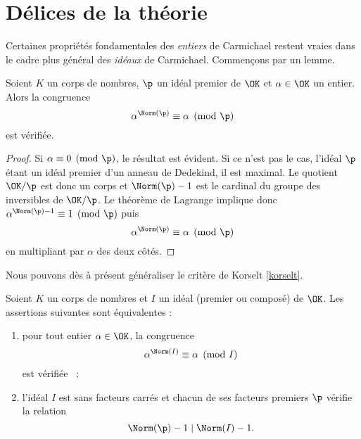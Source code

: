 \section{Délices de la théorie}

Certaines propriétés fondamentales des \emph{entiers} de Carmichael restent vraies dans le cadre plus général des \emph{idéaux} de Carmichael. Commençons par un lemme.

\begin{lemme}\label{identite-1}
	Soient $K$ un corps de nombres, $\p$ un idéal premier de $\OK$ et $\alpha \in \OK$ un entier. Alors la congruence \[\alpha^{\Norm(\p)} \equiv \alpha \pmod{\p}\] est vérifiée.
\end{lemme}

\begin{proof}
	Si $\alpha\equiv 0\pmod{\p}$, le résultat est évident. Si ce n'est pas le cas, l'idéal $\p$ étant un idéal premier d'un anneau de Dedekind, il est maximal. Le quotient $\OK/\p$ est donc un corps et $\Norm(\p) -1$ est le cardinal du groupe des inversibles de $\OK/\p$. Le théorème de Lagrange implique donc $\alpha^{\Norm(\p)-1}\equiv 1 \pmod{\p}$ puis \[\alpha^{\Norm(\p)} \equiv \alpha \pmod{\p}\] en multipliant par $\alpha$ des deux côtés.
\end{proof}

Nous pouvons dès à présent généraliser le critère de Korselt \ref{korselt}.

\begin{theoreme}\label{korselt-generalise}
	Soient $K$ un corps de nombres et $I$ un idéal (premier ou composé) de $\OK$. Les assertions suivantes sont équivalentes :
	\begin{enumerate}
		\item pour tout entier $\alpha \in \OK$, la congruence \[\alpha^{\Norm(I)} \equiv \alpha \pmod{I}\] est vérifiée ~;
		\item l'idéal $I$ est sans facteurs carrés et chacun de ses facteurs premiers $\p$ vérifie la relation \[\Norm(\p) - 1 \mid \Norm(I) - 1.\]
	\end{enumerate}
\end{theoreme}


